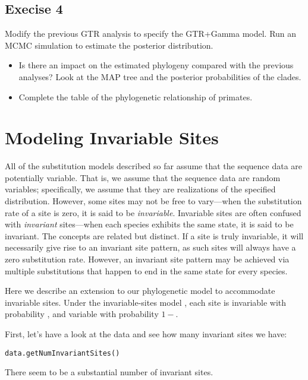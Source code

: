 \subsection{Execise 4}

Modify the previous GTR analysis to specify the GTR+Gamma model. 
Run an MCMC simulation to estimate the posterior distribution.
\begin{itemize}
\item Is there an impact on the estimated phylogeny compared with the previous analyses? 
	Look at the MAP tree and the posterior probabilities of the clades.
\item Complete the table of the phylogenetic relationship of primates.
\end{itemize}



\newpage
\section{Modeling Invariable Sites}
All of the substitution models described so far assume that the sequence data are potentially variable.
That is, we assume that the sequence data are random variables; specifically, we assume that they are realizations of the specified  distribution. 
However, some sites may not be free to vary---when the substitution rate of a site is zero, it is said to be \emph{invariable}.
Invariable sites are often confused with \emph{invariant} sites---when each species exhibits the same state, it is said to be invariant.
The concepts are related but distinct.
If a site is truly invariable, it will necessarily give rise to an invariant site pattern, as such sites will always have a zero substitution rate.
However, an invariant site pattern may be achieved via multiple substitutions that happen to end in the same state for every species.

Here we describe an extension to our phylogenetic model to accommodate invariable sites.
Under the invariable-sites model \citep[][]{Hasegawa1985}, each site is invariable with probability , and variable with probability $1-$.

First, let's have a look at the data and see how many invariant sites we have:
{\tt \begin{snugshade*}
\begin{lstlisting}
data.getNumInvariantSites()
\end{lstlisting}
\end{snugshade*}}
There seem to be a substantial number of invariant sites.

